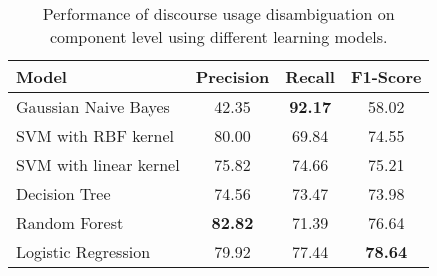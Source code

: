 \begin{table}[ht]
\centering
\begin{tabular}{|l|c|c|c|}
\hline

\bf Model                  & \bf Precision & \bf Recall & \bf F1-Score \\ \hline
    Gaussian Naive Bayes   &     42.35     & \bf 92.17  &     58.02    \\ \hline
    SVM with RBF kernel    &     80.00     &     69.84  &     74.55    \\ \hline
    SVM with linear kernel &     75.82     &     74.66  &     75.21    \\ \hline
    Decision Tree          &     74.56     &     73.47  &     73.98    \\ \hline
    Random Forest          & \bf 82.82     &     71.39  &     76.64    \\ \hline
    Logistic Regression    &     79.92     &     77.44  & \bf 78.64    \\ \hline

\end{tabular}
\caption{\label{t:recognition-models} Performance of discourse usage
disambiguation on component level using different learning models. }
\end{table}
